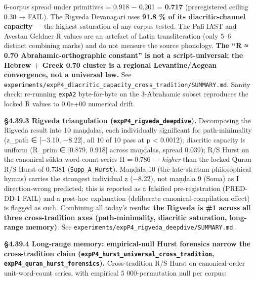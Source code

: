 \documentclass[
]{article}
\begin{document}
6-corpus spread under primitives = 0.918 − 0.201 = \textbf{0.717}
(preregistered ceiling 0.30 → FAIL). The Rigveda Devanagari uses
\textbf{91.8 \% of its diacritic-channel capacity} --- the highest
saturation of any corpus tested. The Pali IAST and Avestan Geldner R
values are an artefact of Latin transliteration (only 5--6 distinct
combining marks) and do not measure the source phonology. \textbf{The
``R ≈ 0.70 Abrahamic-orthographic constant'' is not a script-universal;
the Hebrew + Greek 0.70 cluster is a regional Levantine/Aegean
convergence, not a universal law.} See
\texttt{experiments/expP4\_diacritic\_capacity\_cross\_tradition/SUMMARY.md}.
Sanity check: re-running \texttt{expA2} byte-for-byte on the 3-Abrahamic
subset reproduces the locked R values to 0.0e+00 numerical drift.

\textbf{§4.39.3 Rigveda triangulation
(\texttt{expP4\_rigveda\_deepdive}).} Decomposing the Rigveda result
into 10 maṇḍalas, each individually significant for path-minimality
(z\_path ∈ {[}−3.10, −8.22{]}, all 10 of 10 pass at p \textless{}
0.0012); diacritic capacity is uniform (R\_prim ∈ {[}0.879, 0.918{]}
across maṇḍalas, spread 0.039); R/S Hurst on the canonical sūkta
word-count series H = 0.786 --- \emph{higher} than the locked Quran R/S
Hurst of 0.7381 (\texttt{Supp\_A\_Hurst}). Maṇḍala 10 (the late-stratum
philosophical hymns) carries the strongest individual z (−8.22), not
maṇḍala 9 (Soma) as I direction-wrong predicted; this is reported as a
falsified pre-registration (PRED-DD-1 FAIL) and a post-hoc explanation
(deliberate canonical-compilation effect) is flagged as such. Combining
all today's results: \textbf{the Rigveda is \#1 across all three
cross-tradition axes (path-minimality, diacritic saturation, long-range
memory)}. See \texttt{experiments/expP4\_rigveda\_deepdive/SUMMARY.md}.

\textbf{§4.39.4 Long-range memory: empirical-null Hurst forensics narrow
the cross-tradition claim
(\texttt{expP4\_hurst\_universal\_cross\_tradition},
\texttt{expP4\_quran\_hurst\_forensics}).} Cross-tradition R/S Hurst on
canonical-order unit-word-count series, with empirical 5 000-permutation
null per corpus:
\end{document}

